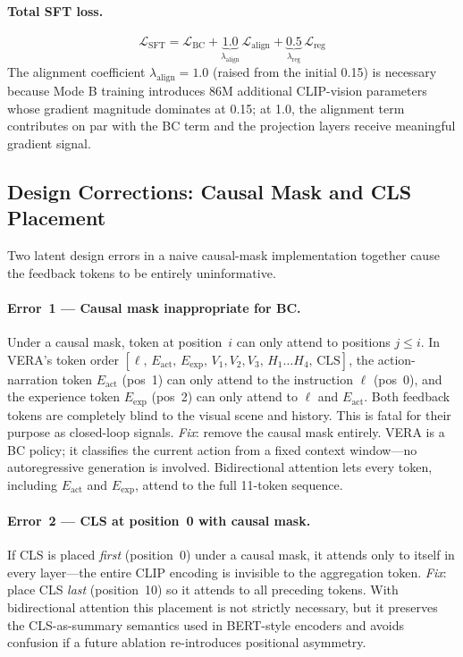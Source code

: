 \documentclass{article}
\begin{document}
\paragraph{Total SFT loss.}
\begin{equation}
  \mathcal{L}_{\mathrm{SFT}}
  = \mathcal{L}_{\mathrm{BC}}
  + \underbrace{1.0}_{\lambda_{\mathrm{align}}}\,\mathcal{L}_{\mathrm{align}}
  + \underbrace{0.5}_{\lambda_{\mathrm{reg}}}\,\mathcal{L}_{\mathrm{reg}}
  \label{eq:sft_loss}
\end{equation}
The alignment coefficient $\lambda_{\mathrm{align}}{=}1.0$ (raised from the
initial 0.15) is necessary because Mode B training introduces 86M additional
CLIP-vision parameters whose gradient magnitude dominates at 0.15; at 1.0,
the alignment term contributes on par with the BC term and the projection
layers receive meaningful gradient signal.

\subsection{Design Corrections: Causal Mask and CLS Placement}
\label{sec:bug}

Two latent design errors in a naive causal-mask implementation together
cause the feedback tokens to be entirely uninformative.

\paragraph{Error~1 — Causal mask inappropriate for BC.}
Under a causal mask, token at position~$i$ can only attend to
positions $j\!\le\!i$.
In VERA's token order
$[\ell,\,E_{\mathrm{act}},\,E_{\mathrm{exp}},\,V_1,V_2,V_3,\,H_1\ldots H_4,\,\mathrm{CLS}]$,
the action-narration token $E_{\mathrm{act}}$ (pos~1) can only attend to
the instruction $\ell$ (pos~0), and the experience token $E_{\mathrm{exp}}$
(pos~2) can only attend to $\ell$ and $E_{\mathrm{act}}$.
Both feedback tokens are completely blind to the visual scene and history.
This is fatal for their purpose as closed-loop signals.
\emph{Fix}: remove the causal mask entirely.
VERA is a BC policy; it classifies the current action from a fixed context
window---no autoregressive generation is involved.
Bidirectional attention lets every token, including $E_{\mathrm{act}}$ and
$E_{\mathrm{exp}}$, attend to the full 11-token sequence.

\paragraph{Error~2 — CLS at position~0 with causal mask.}
If CLS is placed \emph{first} (position~0) under a causal mask,
it attends only to itself in every layer---the entire CLIP encoding
is invisible to the aggregation token.
\emph{Fix}: place CLS \emph{last} (position~10) so it attends to all
preceding tokens.
With bidirectional attention this placement is not strictly necessary, but
it preserves the CLS-as-summary semantics used in BERT-style encoders and
avoids confusion if a future ablation re-introduces positional asymmetry.
\end{document}

